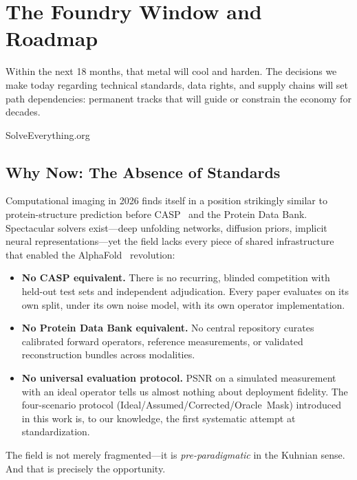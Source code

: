 
\section{The Foundry Window and Roadmap}
\label{sec:roadmap}

\epigraph{Within the next 18 months, that metal will cool and harden.
The decisions we make today regarding technical standards, data rights,
and supply chains will set path dependencies: permanent tracks that
will guide or constrain the economy for decades.}{SolveEverything.org~\cite{wissner2026solveeverything}}

\subsection{Why Now: The Absence of Standards}

Computational imaging in 2026 finds itself in a position strikingly
similar to protein-structure prediction before CASP~\cite{moult2005casp} and the Protein Data
Bank.  Spectacular solvers exist---deep unfolding networks, diffusion
priors, implicit neural representations---yet the field lacks every piece
of shared infrastructure that enabled the AlphaFold~\cite{jumper2021alphafold} revolution:

\begin{itemize}
  \item \textbf{No CASP equivalent.}  There is no recurring, blinded
        competition with held-out test sets and independent adjudication.
        Every paper evaluates on its own split, under its own noise model,
        with its own operator implementation.
  \item \textbf{No Protein Data Bank equivalent.}  No central repository
        curates calibrated forward operators, reference measurements, or
        validated reconstruction bundles across modalities.
  \item \textbf{No universal evaluation protocol.}  PSNR on a simulated
        measurement with an ideal operator tells us almost nothing about
        deployment fidelity.  The four-scenario protocol
        (Ideal/Assumed/Corrected/Oracle~Mask) introduced in this work is,
        to our knowledge, the first systematic attempt at standardization.
\end{itemize}

\noindent
The field is not merely fragmented---it is \emph{pre-paradigmatic} in the
Kuhnian sense.  And that is precisely the opportunity.

